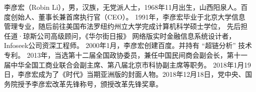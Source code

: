 

\begin{cvparagraph}


\setlength{\parindent}{2em} 
李彦宏（Robin Li），男，汉族，无党派人士，1968年11月出生，山西阳泉人。百度创始人、董事长兼首席执行官（CEO）。
1991年，李彦宏毕业于北京大学信息管理专业，随后前往美国布法罗纽约州立大学完成计算机科学硕士学位，
先后担任道·琼斯公司高级顾问，《华尔街日报》 网络版实时金融信息系统设计者，Infoseek公司资深工程师。
2000年1月，李彦宏创建百度。并持有 “超链分析” 技术专利。 
2013年，当选第十二届全国政协委员，兼任中国民间商会副会长，第十一届中华全国工商业联合会副主席、第八届北京市科协副主席等职务。
2018年1月19日，李彦宏成为了《时代》当期亚洲版的封面人物。2018年12月18日，党中央、国务院授予李彦宏改革先锋称号，颁授改革先锋奖章。

\end{cvparagraph}
